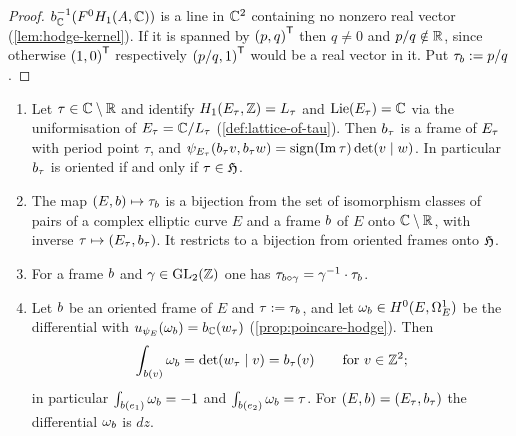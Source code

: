 \begin{proof}
${b}_{\mathbb{C}}^{-1}(F^{0}H_{1}(A,\mathbb{C}))$ is a line in
$\mathbb{C}^{2}$ containing no nonzero real vector
(\cref{lem:hodge-kernel}). If it is spanned by ${(p,q)}^{\mathsf{T}}$ then
$q \neq 0$ and $p/q \notin \mathbb{R}$, since otherwise ${(1,0)}^{\mathsf{T}}$
respectively ${(p/q,1)}^{\mathsf{T}}$ would be a real vector in it. Put
$\tau_{b} := p/q$.
\end{proof}

\begin{proposition}\label{prop:frame-tau}
\begin{enumerate}
\item Let $\tau \in \mathbb{C}\setminus\mathbb{R}$ and identify
  $H_{1}(E_{\tau},\mathbb{Z}) = L_{\tau}$ and
  $\mathrm{Lie}(E_{\tau}) = \mathbb{C}$ via the uniformisation of
  $E_{\tau} = \mathbb{C}/L_{\tau}$ (\cref{def:lattice-of-tau}). Then
  $b_{\tau}$ is a frame of $E_{\tau}$ with period point
  $\tau$, and
  $\psi_{E_{\tau}}(b_{\tau}v, b_{\tau}w) =
  \mathrm{sign}(\mathrm{Im}\,\tau)\det(v\mid w)$. In particular
  $b_{\tau}$ is oriented if and only if $\tau \in \mathfrak{H}$.
\item The map $(E, b) \mapsto \tau_{b}$ is a bijection from
  the set of isomorphism classes of pairs of a complex elliptic curve $E$
  and a frame $b$ of $E$ onto $\mathbb{C}\setminus\mathbb{R}$, with inverse
  $\tau \mapsto (E_{\tau}, b_{\tau})$. It restricts to a
  bijection from oriented frames onto $\mathfrak{H}$.
\item For a frame $b$ and $\gamma \in \GL{2}{\ZZ}$ one has
  $\tau_{b\circ\gamma} = \gamma^{-1}\cdot \tau_{b}$.
\item Let $b$ be an oriented frame of $E$ and $\tau := \tau_{b}$,
  and let $\omega_{b} \in H^{0}(E,\Omega^{1}_{E})$ be the
  differential with
  $u_{\psi_{E}}(\omega_{b}) =
  {b}_{\mathbb{C}}(w_{\tau})$
  (\cref{prop:poincare-hodge}). Then
  \[
    \int_{b(v)}\omega_{b} = \det(w_{\tau}\mid v)
    = b_{\tau}(v) \qquad\text{for } v \in \mathbb{Z}^{2};
  \]
  in particular $\int_{b(e_{1})}\omega_{b} = -1$
  and $\int_{b(e_{2})}\omega_{b} = \tau$. For
  $(E, b) = (E_{\tau}, b_{\tau})$ the differential
  $\omega_{b}$ is $dz$.
\end{enumerate}
\end{proposition}

